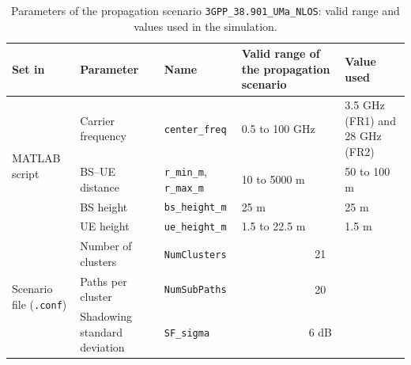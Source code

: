 \begin{table}[!ht]
\caption{Parameters of the propagation scenario \texttt{3GPP\_38.901\_UMa\_NLOS}: valid range and values used in the simulation.}
\label{tab:cenario_uma}
\vspace{4pt} %
\centering
\footnotesize
\renewcommand{\arraystretch}{1.2}
\setlength{\aboverulesep}{0pt}
\setlength{\belowrulesep}{0pt}
\begin{tabular}{|p{1.9cm}|p{2.6cm}|p{3.0cm}|p{2.6cm}|p{2.6cm}|}
\toprule
\centering\textbf{Set in} & \centering\textbf{Parameter} & \centering\textbf{Name} & \centering\textbf{Valid range of the propagation scenario} & \centering\textbf{Value used} \tabularnewline
\midrule
\multirow{4}{=}{\raggedright MATLAB script} & \raggedright Carrier frequency & \raggedright \texttt{center\_\allowbreak{}freq} & \raggedright 0.5 to 100 GHz & \raggedright 3.5 GHz (FR1) and 28 GHz (FR2) \tabularnewline
\cline{2-5}
 & \raggedright BS--UE distance & \raggedright \texttt{r\_\allowbreak{}min\_\allowbreak{}m}, \texttt{r\_\allowbreak{}max\_\allowbreak{}m} & \raggedright 10 to 5000 m & \raggedright 50 to 100 m \tabularnewline
\cline{2-5}
 & \raggedright BS height & \raggedright \texttt{bs\_\allowbreak{}height\_\allowbreak{}m} & \raggedright 25 m & \raggedright 25 m \tabularnewline
\cline{2-5}
 & \raggedright UE height & \raggedright \texttt{ue\_\allowbreak{}height\_\allowbreak{}m} & \raggedright 1.5 to 22.5 m & \raggedright 1.5 m \tabularnewline
\midrule
\multirow{3}{=}{\raggedright Scenario file (\texttt{.conf})} & \raggedright Number of clusters & \raggedright \texttt{NumClusters} & \multicolumn{2}{c|}{21} \tabularnewline
\cline{2-5}
 & \raggedright Paths per cluster & \raggedright \texttt{NumSubPaths} & \multicolumn{2}{c|}{20} \tabularnewline
\cline{2-5}
 & \raggedright Shadowing standard deviation & \raggedright \texttt{SF\_\allowbreak{}sigma} & \multicolumn{2}{c|}{6 dB} \tabularnewline
\bottomrule
\end{tabular}
\vspace{4pt}
\end{table}

